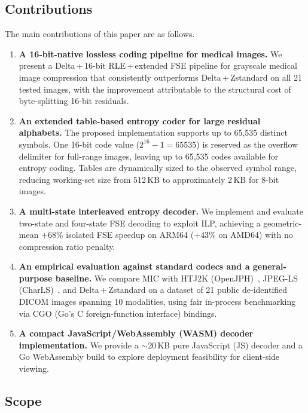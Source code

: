 \documentclass[journal]{IEEEtran}
\begin{document}
\subsection{Contributions}

The main contributions of this paper are as follows.

\begin{enumerate}
  \item \textbf{A 16-bit-native lossless coding pipeline for medical images.}
  We present a Delta\,+\,16-bit RLE\,+\,extended FSE pipeline for grayscale
  medical image compression that consistently outperforms Delta\,+\,Zstandard
  on all 21 tested images, with the improvement attributable to the structural
  cost of byte-splitting 16-bit residuals.

  \item \textbf{An extended table-based entropy coder for large residual
  alphabets.}
  The proposed implementation supports up to 65,535 distinct symbols.
  One 16-bit code value ($2^{16}-1 = 65535$) is reserved as the overflow
  delimiter for full-range images, leaving up to 65,535 codes available for
  entropy coding. Tables are dynamically sized to the observed symbol range,
  reducing working-set size from 512\,KB to approximately 2\,KB for 8-bit
  images.

  \item \textbf{A multi-state interleaved entropy decoder.}
  We implement and evaluate two-state and four-state FSE decoding to exploit
  ILP, achieving a geometric-mean $+$68\% isolated FSE speedup on ARM64
  ($+$43\% on AMD64) with no compression ratio penalty.

  \item \textbf{An empirical evaluation against standard codecs and a
  general-purpose baseline.}
  We compare MIC with HTJ2K (OpenJPH)~\cite{openjph}, JPEG-LS
  (CharLS)~\cite{charls}, and Delta\,+\,Zstandard on a dataset of 21 public
  de-identified DICOM images spanning 10 modalities, using fair in-process
  benchmarking via CGO (Go's C foreign-function interface) bindings.

  \item \textbf{A compact JavaScript/WebAssembly (WASM) decoder implementation.}
  We provide a ${\sim}$20\,KB pure JavaScript (JS) decoder and a Go
  WebAssembly build to explore deployment feasibility for client-side viewing.
\end{enumerate}

\subsection{Scope}
\end{document}
